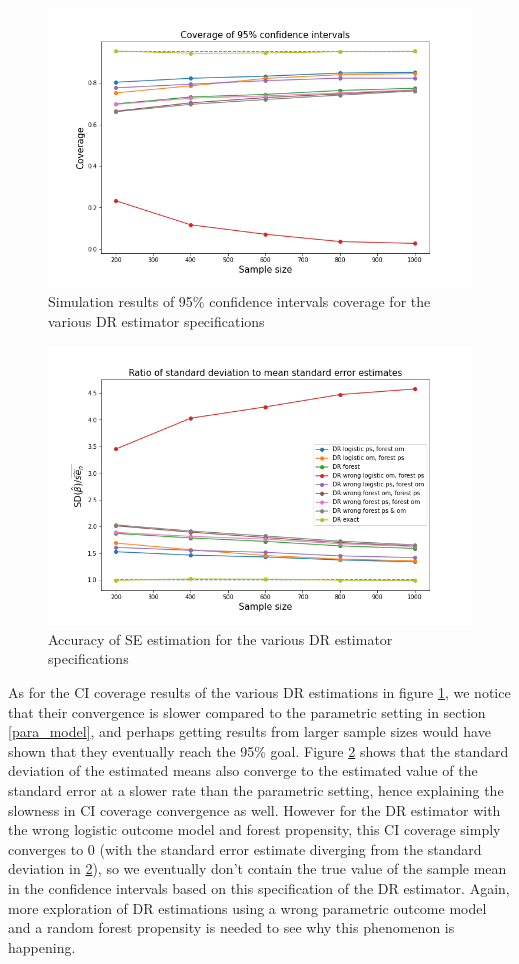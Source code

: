 \documentclass[12pt,twoside]{article}
\begin{document}
\begin{figure}[h!]
    \centering
    \includegraphics[width = 0.9\columnwidth]{figures/CIRF.png}
    \caption{Simulation results of 95\% confidence intervals coverage for the various DR estimator specifications}
    \label{figCIRF}
\end{figure}

\begin{figure}[h!]
    \centering
    \includegraphics[width = 0.9\columnwidth]{figures/SERF.png}
    \caption{Accuracy of \citet{lunceford_davidian} SE estimation for the various DR estimator specifications}
    \label{figSERF}
\end{figure}

As for the CI coverage results of the various DR estimations in figure \ref{figCIRF}, we notice that their convergence is slower compared to the parametric setting in section \ref{para_model}, and perhaps getting results from larger sample sizes would have shown that they eventually reach the 95\% goal. Figure \ref{figSERF} shows that the standard deviation of the estimated means also converge to the estimated value of the standard error at a slower rate than the parametric setting, hence explaining the slowness in CI coverage convergence as well. However for the DR estimator with the wrong logistic outcome model and forest propensity, this CI coverage simply converges to 0 (with the standard error estimate diverging from the standard deviation in \ref{figSERF}), so we eventually don't contain the true value of the sample mean in the confidence intervals based on this specification of the DR estimator. Again, more exploration of DR estimations using a wrong parametric outcome model and a random forest propensity is needed to see why this phenomenon is happening.
\end{document}
